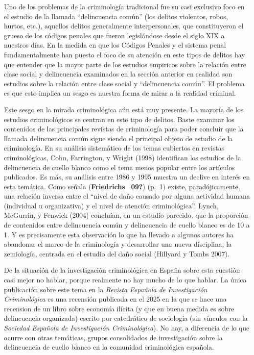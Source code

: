\documentclass[
  spanish,
  letterpaper,
  DIV=11,
  numbers=noendperiod]{scrreprt}
\begin{document}
Uno de los problemas de la criminología tradicional fue su casi
exclusivo foco en el estudio de la llamada ``delincuencia común'' (los
delitos violentos, robos, hurtos, etc.), aquellos delitos generalmente
interpersonales, que constituyeron el grueso de los códigos penales que
fueron legislándose desde el siglo XIX a nuestros días. En la medida en
que los Códigos Penales y el sistema penal fundamentalmente han puesto
el foco de su atención en este tipos de delitos hay que entender que la
mayor parte de los estudios empiricos sobre la relación entre clase
social y delincuencia examinados en la sección anterior en realidad son
estudios sobre la relación entre clase social y ``delincuencia común''.
El problema es que esto implica un sesgo es nuestra forma de mirar a la
realidad criminal.

Este sesgo en la mirada criminológica aún está muy presente. La mayoría
de los estudios criminológicos se centran en este tipo de delitos. Baste
examinar los contenidos de las principales revistas de criminología para
poder concluir que la llamada delincuencia común sigue siendo el
principal objeto de estudio de la criminología. En su análisis
sistemático de los temas cubiertos en revistas criminológicas, Cohn,
Farrington, y Wright (1998) identifican los estudios de la delincuencia
de cuello blanco como el tema menos popular entre los artículos
publicados. Es más, su análisis entre 1986 y 1995 muestra un declive en
interés en esta temática. Como señala (\textbf{Friedrichs\_09?}) (p.~1)
existe, paradójicamente, una relación inversa entre el ``nivel de daño
causado por alguna actividad humana (individual u organizativa) y el
nivel de atención criminológica''. Lynch, McGurrin, y Fenwick (2004)
concluían, en un estudio parecido, que la proporción de contenidos entre
delincuencia común y delincuencia de cuello blanco es de 10 a 1. Y es
precisamente esta observación lo que ha llevado a algunos autores ha
abandonar el marco de la criminología y desarrollar una nueva
disciplina, la zemiología, centrada en el estudio del daño social
(Hillyard y Tombs 2007).

De la situación de la investigación criminológica en España sobre esta
cuestión casi mejor no hablar, porque realmente no hay mucho de lo que
hablar. La única publicación sobre este tema en la \emph{Revista
Española de Investigación Criminológica} es una recensión publicada en
el 2025 en la que se hace una recension de un libro sobre economía
ilícita (y que en buena medida es sobre delincuencia organizada) escrito
por catedrático de sociología (sin vínculos con la \emph{Sociedad
Española de Investigación Criminológica}). No hay, a diferencia de lo
que ocurre con otras temáticas, grupos consolidados de investigación
sobre la delincuencia de cuello blanco en la comunidad criminológica
española.
\end{document}
